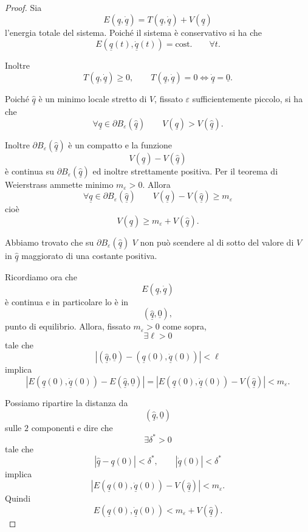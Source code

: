 \begin{proof}
Sia
\[
E(\underline{q},\dot{\underline{q}})
=
T(\underline{q} , \dot{\underline{q}})+V(\underline{q})
\]
l'energia totale del sistema. Poiché il sistema è conservativo si ha che
\[
E(\underline{q}(t),\dot{\underline{q}}(t))=\text{cost.}
\qquad \forall t.
\]

Inoltre
\[
T(\underline{q} , \dot{\underline{q}})\geq 0,
\qquad
T(\underline{q} , \dot{\underline{q}})=0
\Longleftrightarrow
\dot{\underline{q}}=\underline{0}.
\]

Poiché \(\hat{\underline{q}}\) è un minimo locale stretto di \(V\),
fissato \(\varepsilon\) sufficientemente piccolo, si ha che
\[
\forall \underline{q}\in \partial B_\varepsilon
(\hat{\underline{q}})
\qquad
V(\underline{q})>V(\hat{\underline{q}}).
\]

Inoltre \(\partial B_\varepsilon(\hat{\underline{q}})\) è un compatto e
la funzione
\[
V(\underline{q})-V(\hat{\underline{q}})
\]
è continua su \(\partial B_\varepsilon(\hat{\underline{q}})\) ed inoltre
strettamente positiva. Per il teorema di Weierstrass ammette minimo
\(m_\varepsilon>0\). Allora
\[
\forall \underline{q}\in \partial B_\varepsilon(\hat{\underline{q}})
\qquad
V(\underline{q})-V(\hat{\underline{q}})\geq m_\varepsilon
\]
cioè
\[
V(\underline{q})\geq m_\varepsilon+V(\hat{\underline{q}}).
\]

Abbiamo trovato che su \(\partial B_\varepsilon(\hat{\underline{q}})\)
\(V\) non può scendere al di sotto del valore di \(V\) in
\(\hat{\underline{q}}\) maggiorato di una costante positiva.

Ricordiamo ora che
\[
E(\underline{q},\dot{\underline{q}})
\]
è continua e in particolare lo è in
\[
(\hat{\underline{q}},\underline{0}),
\]
punto di equilibrio. Allora, fissato \(m_\varepsilon>0\) come sopra,
\[
\exists \ell>0
\]
tale che
\[
\left|
(\hat{\underline{q}},\underline{0})
-
(\underline{q}(0),\dot{\underline{q}}(0))
\right|<\ell
\]
implica
\[
\left|
E(\underline{q}(0),\dot{\underline{q}}(0))
-
E(\hat{\underline{q}},\underline{0})
\right|
=
\left|
E(\underline{q}(0),\dot{\underline{q}}(0))
-
V(\hat{\underline{q}})
\right|
<m_\varepsilon.
\]

Possiamo ripartire la distanza da
\[
(\hat{\underline{q}},\underline{0})
\]
sulle \(2\) componenti e dire che
\[
\exists \delta^*>0
\]
tale che
\[
|\hat{\underline{q}}-\underline{q}(0)|<\delta^*,
\qquad
|\dot{\underline{q}}(0)|<\delta^*
\]
implica
\[
\left|
E(\underline{q}(0),\dot{\underline{q}}(0))
-
V(\hat{\underline{q}})
\right|
<m_\varepsilon.
\]
Quindi
\[
E(\underline{q}(0),\dot{\underline{q}}(0))
<
m_\varepsilon+V(\hat{\underline{q}}).
\]


\end{proof}
